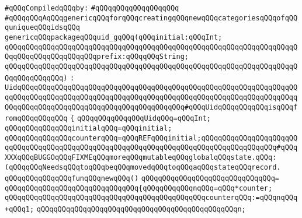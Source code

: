 \label{src/lib/c-kit/src/ast/uid-g.pkg}
\newline
\verb|#qQQqCompiledqQQqby:|\newline
\verb|#qQQqqQQqqQQqqQQqqQQq|\newline
\newline
\verb|#qQQqqQQqAqQQqgenericqQQqforqQQqcreatingqQQqnewqQQqcategoriesqQQqofqQQquniqueqQQqidsqQQq|\newline
\newline
\verb|genericqQQqpackageqQQquid_gqQQq(qQQqinitial:qQQqInt;|\newline
\verb|qQQqqQQqqQQqqQQqqQQqqQQqqQQqqQQqqQQqqQQqqQQqqQQqqQQqqQQqqQQqqQQqqQQqqQQqqQQqqQQqqQQqqQQqqQQqprefix:qQQqqQQqString;|\newline
\verb|qQQqqQQqqQQqqQQqqQQqqQQqqQQqqQQqqQQqqQQqqQQqqQQqqQQqqQQqqQQqqQQqqQQqqQQqqQQqqQQqqQQq)|\newline
\verb|:|\newline
\verb|UidqQQqqQQqqQQqqQQqqQQqqQQqqQQqqQQqqQQqqQQqqQQqqQQqqQQqqQQqqQQqqQQqqQQqqQQqqQQqqQQqqQQqqQQqqQQqqQQqqQQqqQQqqQQqqQQqqQQqqQQqqQQqqQQqqQQqqQQqqQQqqQQqqQQqqQQqqQQqqQQqqQQqqQQqqQQqqQQqqQQq#qQQqUidqQQqqQQqqQQqisqQQqfromqQQqqQQqqQQq|\newline
\verb|{|\newline
\verb|qQQqqQQqqQQqqQQqUidqQQq=qQQqInt;|\newline
\newline
\verb|qQQqqQQqqQQqqQQqinitialqQQq=qQQqinitial;|\newline
\newline
\verb|qQQqqQQqqQQqqQQqcounterqQQq=qQQqREFqQQqinitial;qQQqqQQqqQQqqQQqqQQqqQQqqQQqqQQqqQQqqQQqqQQqqQQqqQQqqQQqqQQqqQQqqQQqqQQqqQQqqQQqqQQqqQQq#qQQqXXXqQQqBUGGOqQQqFIXMEqQQqmoreqQQqmutableqQQqglobalqQQqstate.qQQq:(qQQqqQQqNeedsqQQqtoqQQqbeqQQqmovedqQQqtoqQQqaqQQqstateqQQqrecord.|\newline
\newline
\verb|qQQqqQQqqQQqqQQqfunqQQqnewqQQq()|\newline
\verb|qQQqqQQqqQQqqQQqqQQqqQQqqQQqqQQq=|\newline
\verb|qQQqqQQqqQQqqQQqqQQqqQQqqQQqqQQq{qQQqqQQqqQQqnqQQq=qQQq*counter;|\newline
\verb|qQQqqQQqqQQqqQQqqQQqqQQqqQQqqQQqqQQqqQQqqQQqqQQqcounterqQQq:=qQQqnqQQq+qQQq1;|\newline
\verb|qQQqqQQqqQQqqQQqqQQqqQQqqQQqqQQqqQQqqQQqqQQqqQQqn;|\newline
